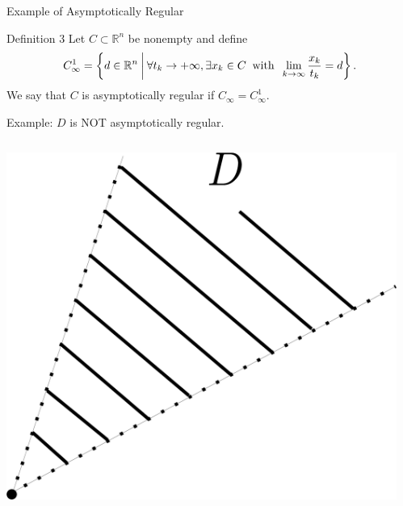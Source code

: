\documentclass[aspectratio=169, dvipdfmx, 11pt]{beamer} %
\newcommand{\NDemenstionalRealEuclidianSpace}{\mathbb{R}^n}
\begin{document}
\begin{frame}{Example of Asymptotically Regular}
    \begin{block}{Definition 3}
        Let $C \subset \NDemenstionalRealEuclidianSpace$ be nonempty and define
        \begin{equation}
            C_{\infty}^1 = \left\{d \in \NDemenstionalRealEuclidianSpace \:\middle|\: \forall t_k \rightarrow + \infty , \exists x_k \in C \:\text{ with }\: \lim_{k \to \infty} \frac{x_k}{t_k} = d \right\}. \notag
        \end{equation}
        We say that $C$ is asymptotically regular if $C_{\infty} = C_{\infty}^1$.
    \end{block}

    Example: $D$ is NOT asymptotically regular.

    \centering
    \begin{columns}
        \begin{column}{0.48\textwidth}
        \centering
        \includegraphics[keepaspectratio, scale=0.085]{figures/example_not_asymptotically_regular_1.eps}
        \end{column}
        \pause
        \begin{column}{0.48\textwidth}
        \centering

\end{column}
\end{columns}
\end{frame}
\end{document}
